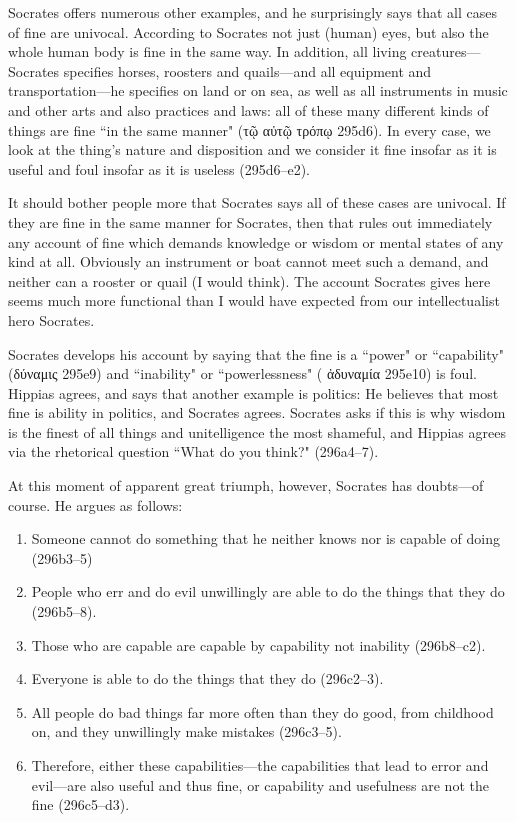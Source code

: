 \documentclass[11pt]{article}
\begin{document}
Socrates offers numerous other examples, and he surprisingly says that all
cases of fine are univocal.  According to Socrates not just (human) eyes, but
also the whole human body is fine in the same way.  In addition, all living
creatures---Socrates specifies horses, roosters and quails---and all equipment
and transportation---he specifies on land or on sea, as well as all instruments
in music and other arts and also practices and laws: all of these many
different kinds of things are fine ``in the same manner" ({\g τῷ αὐτῷ τρόπῳ}
295d6).  In every case, we look at the thing's nature and disposition and we
consider it fine insofar as it is useful and foul insofar as it is useless
(295d6--e2).

It should bother people more that Socrates says all of these cases are
univocal.  If they are fine in the same manner for Socrates, then that rules
out immediately any account of fine which demands knowledge or wisdom or mental
states of any kind at all.  Obviously an instrument or boat cannot meet such
a demand, and neither can a rooster or quail (I would think).  The account
Socrates gives here seems much more functional than I would have expected from
our intellectualist hero Socrates.

Socrates develops his account by saying that the fine is a ``power" or
``capability" ({\g δύναμις} 295e9) and ``inability" or ``powerlessness" ({\g
ἀδυναμία} 295e10) is foul.  Hippias agrees, and says that another example is
politics: He believes that most fine is ability in politics, and Socrates
agrees.  Socrates asks if this is why wisdom is the finest of all things and
unitelligence the most shameful, and Hippias agrees via the rhetorical question
``What do you think?" (296a4--7).

At this moment of apparent great triumph, however, Socrates has doubts---of
course.  He argues as follows:

\begin{enumerate}

    \item Someone cannot do something that he neither knows nor is capable of
        doing (296b3--5)

    \item People who err and do evil unwillingly are able to do the things that
        they do (296b5--8).

    \item Those who are capable are capable by capability not inability
        (296b8--c2).

    \item Everyone is able to do the things that they do (296c2--3).

    \item All people do bad things far more often than they do good, from
        childhood on, and they unwillingly make mistakes (296c3--5).

    \item Therefore, either these capabilities---the capabilities that lead to
        error and evil---are also useful and thus fine, or capability and
        usefulness are not the fine (296c5--d3).

\end{enumerate}
\end{document}

